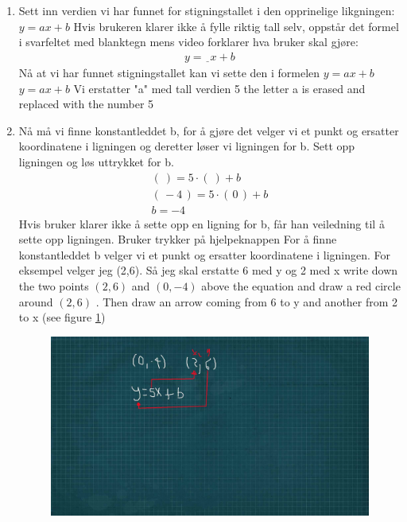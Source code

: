 \documentclass[12pt,twoside,onecolumn]{article}
\begin{document}
\begin{Exercise}
\begin{enumerate}
\item Sett inn verdien vi har funnet for stigningstallet i den opprinelige likgningen: $y = ax + b$ \newline
{\color{Maroon} Hvis brukeren klarer ikke å fylle riktig tall selv, oppstår det formel i svarfeltet med blanktegn mens video forklarer hva bruker skal gjøre: 
\begin{align}
y = \underline{\phantom{0}}x + b
\end{align}}
{\color{gray} Nå at vi har funnet stigningstallet kan vi sette den i formelen  $y = ax + b$ } \newline
{\color{PineGreen} $y = ax + b$  } \newline
{\color{gray}Vi erstatter "a" med tall verdien 5 } \newline
{\color{PineGreen} the letter a is erased and replaced with the number 5 }
\newline\newline
\item Nå må vi finne konstantleddet b, for å gjøre det velger vi et punkt og ersatter koordinatene i ligningen og deretter løser vi ligningen for b. Sett opp ligningen og løs uttrykket for b.
\begin{align}
(\:) = 5\cdot(\:) + b\\
(\, -4 \, ) = 5\cdot (\, 0 \, ) + b \\
b = -4
\end{align}
{\color{Maroon} Hvis bruker klarer ikke å sette opp en ligning for b, får han veiledning til å sette opp ligningen. Bruker trykker på hjelpeknappen} \newline
{\color{gray}For å  finne konstantleddet b  velger vi et punkt og ersatter koordinatene i ligningen. For eksempel velger jeg (2,6). Så jeg skal erstatte 6 med y og 2 med x} \newline
{\color{PineGreen} write down the two points  $(2,6)$  and  $(0,-4 )$ above the equation and draw a red circle around $(2,6)$ . Then draw an arrow coming from 6 to y and another from 2 to x (see figure \ref{fig:Opp11S4})}
\begin{figure}[h!]
\label{fig:Opp11S4}
\centering
\includegraphics[scale = 1.3]{figures/Opp11S4.jpg}

\end{figure}
\end{enumerate}
\end{Exercise}
\end{document}

